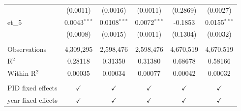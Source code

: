 \begin{tabular}{lccccc}
                      & (0.0011)         & (0.0016)             & (0.0011)              & (0.2869)      & (0.0027)\\   
   et\_5              & 0.0043$^{***}$   & 0.0108$^{***}$       & 0.0072$^{***}$        & -0.1853       & 0.0155$^{***}$\\   
                      & (0.0008)         & (0.0015)             & (0.0011)              & (0.1304)      & (0.0032)\\   
    \\
   Observations       & 4,309,295        & 2,598,476            & 2,598,476             & 4,670,519     & 4,670,519\\  
   R$^2$              & 0.28118          & 0.31350              & 0.31380               & 0.68678       & 0.58166\\  
   Within R$^2$       & 0.00035          & 0.00034              & 0.00077               & 0.00042       & 0.00032\\  
    \\
   PID fixed effects  & $\checkmark$     & $\checkmark$         & $\checkmark$          & $\checkmark$  & $\checkmark$\\   
   year fixed effects & $\checkmark$     & $\checkmark$         & $\checkmark$          & $\checkmark$  & $\checkmark$\\   
   \bottomrule
\end{tabular}
\par\endgroup


